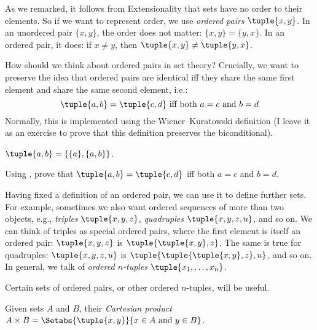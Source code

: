 %
%

%
\begin{explain}
	As we remarked, it follows from Extensionality that sets have no order to their elements. So if we want to represent order, we use \emph{ordered pairs} $\tuple{x, y}$. In an unordered pair $\{x, y\}$, the order does not matter: $\{x, y\} = \{y, x\}$. In an ordered pair, it does: if $x \neq y$, then $\tuple{x, y} \neq \tuple{y, x}$.

How should we think about ordered pairs in set theory? Crucially, we want to preserve the idea that ordered pairs are identical iff they share the same first element and share the same second element, i.e.:
	$$\tuple{a, b}= \tuple{c, d}\text{ iff both }a = c \text{ and }b=d $$
Normally, this is implemented using the Wiener--Kuratowski definition (I leave it as an exercise to prove that this definition preserves the biconditional).
\end{explain}
\begin{defn}
	$\tuple{a, b} = \{\{a\}, \{a, b\}\}$.
\end{defn}
\begin{prob}
	Using , prove that $\tuple{a, b}= \tuple{c, d}$ iff both $a = c$ and $b=d$.
\end{prob}
\begin{explain}
	Having fixed a definition of an ordered pair, we can use it to define further sets. For example, sometimes we also want ordered sequences of more than two objects,
	e.g., \emph{triples} $\tuple{x, y, z}$, \emph{quadruples} $\tuple{x,
		y, z, u}$, and so on.  We can think of triples as special
	ordered pairs, where the first element is itself an ordered pair:
	$\tuple{x, y, z}$ is $\tuple{\tuple{x, y},z}$. The same is
	true for quadruples: $\tuple{x,y,z,u}$ is 
	$\tuple{\tuple{\tuple{x,y},z},u}$, and so on. In general, we talk of
	\emph{ordered $n$-tuples} $\tuple{x_1, \dots, x_n}$.

	Certain sets of ordered pairs, or other ordered $n$-tuples, will be useful.
\end{explain}
	\begin{defn}
		Given sets $A$ and $B$, their \emph{Cartesian product} $A \times B = \Setabs{\tuple{x, y}}{x \in A \text{ and } y \in B}$.
	\end{defn}
	
